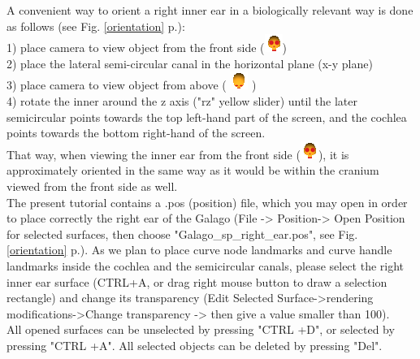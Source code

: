 \documentclass[12pt, a4paper]{book}
\begin{document}
A convenient way to orient a right inner ear in a biologically relevant way is done as follows (see Fig. \ref{orientation} p.\pageref{orientation}):\\
1) place camera to view object from the front side (\includegraphics[scale=0.7]{../images/06/camera/camera_front.png})\\
2) place the lateral semi-circular canal in the horizontal plane (x-y plane)\\
3) place camera  to view object from above ( \includegraphics[scale=0.7]{../images/06/camera/camera_above.png} )\\
4) rotate the inner around the z axis ("rz" yellow slider) until the later semicircular points towards the top left-hand part of the screen, and the cochlea points towards the bottom right-hand of the screen.\\
That way, when viewing the inner ear from the front side (\includegraphics[scale=0.7]{../images/06/camera/camera_front.png}), it is approximately oriented in the same way as it would be within the cranium viewed from the front side as well.\\

The present tutorial contains a .pos (position) file, which you may open in order to place correctly the right ear of the Galago (File -> Position-> Open Position for selected surfaces, then choose "Galago\_sp\_right\_ear.pos", see Fig. \ref{orientation} p.\pageref{orientation}). As we plan to place curve node landmarks and curve handle landmarks inside the cochlea and the semicircular canals, please select the right inner ear surface (CTRL+A, or drag right mouse button to draw a selection rectangle) and change its transparency (Edit Selected Surface->rendering modifications->Change transparency -> then give a value smaller than 100).\\
All opened surfaces can be unselected by pressing "CTRL +D", or selected by pressing "CTRL +A". All selected objects can be deleted by pressing "Del".
\end{document}
